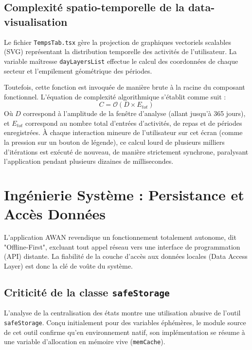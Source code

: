 \documentclass[11pt, a4paper]{article}
\begin{document}
\subsection{Complexité spatio-temporelle de la data-visualisation}
Le fichier \texttt{TempsTab.tsx} gère la projection de graphiques vectoriels scalables (SVG) représentant la distribution temporelle des activités de l'utilisateur.
La variable maîtresse \texttt{dayLayersList} effectue le calcul des coordonnées de chaque secteur et l'empilement géométrique des périodes.

Toutefois, cette fonction est invoquée de manière brute à la racine du composant fonctionnel. L'équation de complexité algorithmique s'établit comme suit :
\begin{equation}
    C = \mathcal{O}(D \times E_{tot})
\end{equation}
Où $D$ correspond à l'amplitude de la fenêtre d'analyse (allant jusqu'à 365 jours), et $E_{tot}$ correspond au nombre total d'entrées d'activités, de repas et de périodes enregistrées.
À chaque interaction mineure de l'utilisateur sur cet écran (comme la pression sur un bouton de légende), ce calcul lourd de plusieurs milliers d'itérations est exécuté de nouveau, de manière strictement synchrone, paralysant l'application pendant plusieurs dizaines de millisecondes.

\newpage

\section{Ingénierie Système : Persistance et Accès Données}

L'application AWAN revendique un fonctionnement totalement autonome, dit "Offline-First", excluant tout appel réseau vers une interface de programmation (API) distante. La fiabilité de la couche d'accès aux données locales (Data Access Layer) est donc la clé de voûte du système.

\subsection{Criticité de la classe \texttt{safeStorage}}
L'analyse de la centralisation des états montre une utilisation abusive de l'outil \texttt{safeStorage}. Conçu initialement pour des variables éphémères, le module source de cet outil confirme qu'en environnement natif, son implémentation se résume à une variable d'allocation en mémoire vive (\texttt{memCache}).
\end{document}
